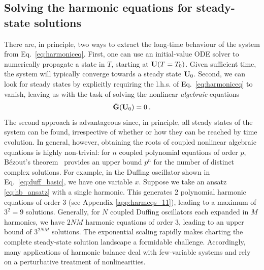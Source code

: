 \subsection{Solving the harmonic equations for steady-state solutions}\label{sec:hb_solving} 
There are, in principle, two ways to extract the long-time behaviour of the system from Eq.~\eqref{eq:harmoniceq}. First, one can use an initial-value ODE solver to numerically propagate a state in $T$, starting at $\vb{U}(T=T_0)$. Given sufficient time, the system will typically converge towards a steady state $\vb{U}_0$. Second, we can look for steady states by explicitly requiring the l.h.s. of Eq.~\eqref{eq:harmoniceq} to vanish, leaving us with the task of solving the nonlinear \textit{algebraic} equations
%
\begin{equation}\label{eq:harmonic_balance}
\bar{\vb{G}} (\vb{U}_0) = 0\:.
\end{equation} 
%
The second approach is advantageous since, in principle, all steady states of the system can be found, irrespective of whether or how they can be reached by time evolution. In general, however, obtaining the roots of coupled nonlinear algebraic equations is highly non-trivial: for $n$ coupled polynomial equations of order $p$, B\'{e}zout's theorem~\cite{Cox_2013} provides an upper bound $p^n$ for the number of distinct complex solutions. For example, in the Duffing oscillator shown in Eq.~\eqref{eq:duff_basic}, we have one variable $x$. Suppose we take an ansatz \eqref{eq:hb_ansatz} with a single harmonic. This generates 2 polynomial harmonic equations of order 3 (see Appendix \ref{app:harmeqs_11}), leading to a maximum of $3^2=9$ solutions. Generally, for $N$ coupled Duffing oscillators each expanded in $M$ harmonics, we have $2NM$ harmonic equations of order 3, leading to an upper bound of $3^{2NM}$ solutions. The exponential scaling rapidly makes charting the complete steady-state solution landscape
a formidable challenge. Accordingly, many applications of harmonic balance deal with few-variable systems and rely on a perturbative treatment of nonlinearities.

